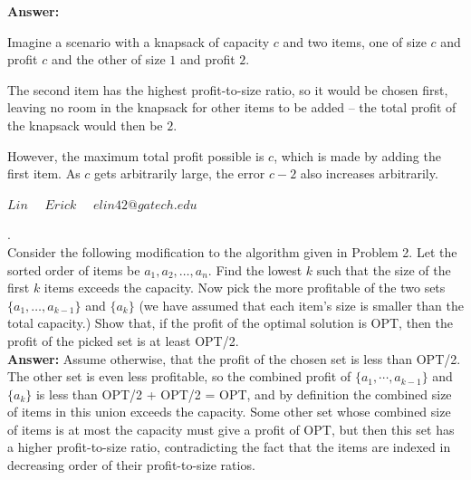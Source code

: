 \documentclass[a4paper,11pt]{article}
\begin{document}
\noindent
{\bf Answer:}
\iffalse
    Imagine a scenario with a knapsack of capacity $c$, $n$ items of size $s$ and profit $p$ where $c = ns$ and $s \mid p$, and $1$ item of size $c - s + 1$ and profit $(c - s + 1)p/s$. \par
    Then the last item has the highest profit-to-size ratio, so it would be chosen first, leaving no room in the knapsack for other items to be added -- the total profit of the knapsack would then be $(c - s + 1)p/s = (c + 1)p/s - 1$. \par
    However, the maximum total profit possible is $np = cp/s$, which is made by adding the $n$ items of size $s$.
\fi
Imagine a scenario with a knapsack of capacity $c$ and two items, one of size $c$ and profit $c$ and the other of size $1$ and profit $2$. \par
The second item has the highest profit-to-size ratio, so it would be chosen first, leaving no room in the knapsack for other items to be added -- the total profit of the knapsack would then be $2$. \par
However, the maximum total profit possible is $c$, which is made by adding the first item. As $c$ gets arbitrarily large, the error $c - 2$ also increases arbitrarily.


\pagebreak 

 $Lin \quad$
 $Erick \quad$
          $elin42@gatech.edu$\\

\bigskip


.  \\
Consider the following modification to the algorithm given in Problem 2. 
Let the sorted order of items be $a_1 , a_2 , \ldots , a_n$. 
Find the lowest $k$ such that the size of the first $k$ items exceeds the capacity. 
Now pick the more profitable of the two sets
$\{ a_1 , \ldots, a_{k-1} \}$ and $\{ a_k \}$ (we have assumed that each item's size is smaller than the total capacity.) 
Show that, if the profit of the optimal solution is OPT, then the profit of the picked set is at least OPT/2. \\

\noindent
{\bf Answer:}
Assume otherwise, that the profit of the chosen set is less than OPT/2. The other set is even less profitable, so the combined profit of $\{ a_1, \cdots, a_{k - 1} \}$ and $\{ a_k \}$ is less than OPT/2 + OPT/2 = OPT, and by definition the combined size of items in this union exceeds the capacity. Some other set whose combined size of items is at most the capacity must give a profit of OPT, but then this set has a higher profit-to-size ratio, contradicting the fact that the items are indexed in decreasing order of their profit-to-size ratios.
\end{document}
